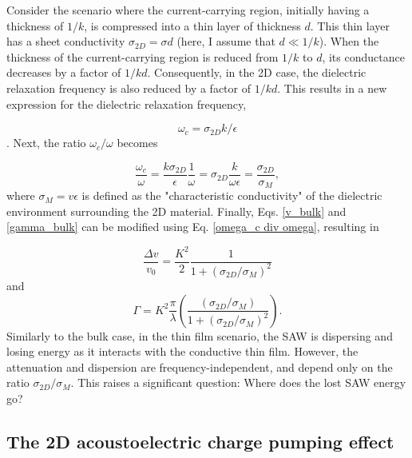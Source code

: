 \documentclass[double,12pt,1in]{beavtex}
\begin{document}
Consider the scenario where the current-carrying region, initially having a thickness of $1/k$, is compressed into a thin layer of thickness $d$. This thin layer has a sheet conductivity $\sigma_{2D} = \sigma d$ (here, I assume that $d \ll 1/k$). When the thickness of the current-carrying region is reduced from $1/k$ to $d$, its conductance decreases by a factor of $1/kd$. Consequently, in the 2D case, the dielectric relaxation frequency is also reduced by a factor of $1/kd$. This results in a new expression for the dielectric relaxation frequency, 

\begin{equation}
    \omega_c = \sigma_{2D}k/\epsilon
\end{equation}. 
Next, the ratio $\omega_c/\omega$ becomes

\begin{equation}
    \frac{\omega_c}{\omega} = \frac{k\sigma_{2D}}{\epsilon}\frac{1}{\omega} = \sigma_{2D}\frac{k}{\omega \epsilon} = \frac{\sigma_{2D}}{\sigma_M}, \label{omega_c div omega}
\end{equation}
where $\sigma_M = v \epsilon$ is defined as the "characteristic conductivity" of the dielectric environment surrounding the 2D material. Finally, Eqs. \ref{v_bulk} and \ref{gamma_bulk} can be modified using Eq. \ref{omega_c div omega}, resulting in 

\begin{equation}
    \frac{\Delta v}{v_0} = \frac{K^2}{2}\frac{1}{1+(\sigma_{2D}/\sigma_M)^2} \label{v_2D}
\end{equation}
and
\begin{equation}
    \Gamma = K^2 \frac{\pi}{\lambda}\left(\frac{(\sigma_{2D}/\sigma_M)}{1+(\sigma_{2D}/\sigma_M)^2}\right). \label{gamma_2D}
\end{equation}
Similarly to the bulk case, in the thin film scenario, the SAW is dispersing and losing energy as it interacts with the conductive thin film. However, the attenuation and dispersion are frequency-independent, and depend only on the ratio $\sigma_{2D}/\sigma_M$. This raises a significant question: Where does the lost SAW energy go? 


\subsection{The 2D acoustoelectric charge pumping effect}

\end{document}
